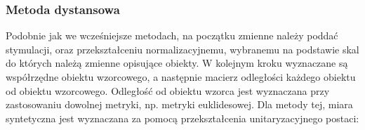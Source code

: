 \documentclass[12pt,a4paper]{report}
\begin{document}
%
%
%
%
%
%
%
%
%

\subsubsection{Metoda dystansowa}


Podobnie jak we wcześniejsze metodach, na początku zmienne należy poddać stymulacji, oraz przekształceniu normalizacyjnemu, wybranemu na podstawie skal do których należą zmienne opisujące obiekty. W kolejnym kroku wyznaczane są współrzędne obiektu wzorcowego, a następnie macierz odległości każdego obiektu od obiektu wzorcowego. Odległość od obiektu wzorca jest wyznaczana przy zastosowaniu dowolnej metryki, np. metryki euklidesowej. %
Dla metody tej, miara syntetyczna jest wyznaczana za pomocą przekształcenia unitaryzacyjnego postaci: 
\end{document}
